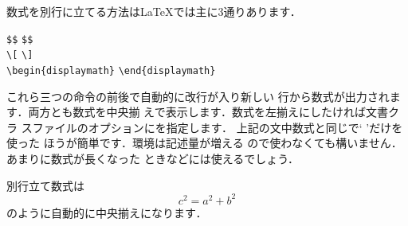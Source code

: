 数式を別行に立てる方法は{\LaTeX}では主に3通りあります．
\glossary{[@\hspace*{-1.2ex}\verb+\[+}%
\glossary{]@\hspace*{-1.2ex}\verb+\]+}%
%
\begin{Syntax}
\verb|$$|  \verb|$$| \\
\verb|\[|  \verb|\]| \\
\verb|\begin{displaymath}|  \verb|\end{displaymath}|
\end{Syntax}
これら三つの命令の前後で自動的に改行が入り新しい
行から数式が出力されます．両方とも数式を中央揃%
%
%
えで表示します．数式を左揃えにしたければ文書クラ
スファイルのオプションにを指定します．
上記の文中数式と同じで`\cmd{[} \cmd{]}'だけを使った
ほうが簡単です．環境は記述量が増える
ので使わなくても構いません．あまりに数式が長くなった
ときなどには使えるでしょう．
\begin{InOut}
別行立て数式は \[ 
        c^2 = a^2 + b^2 
\] のように自動的に中央揃えになります．
\end{InOut}

